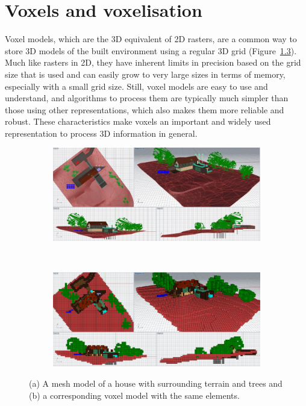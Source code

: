 
\setchapterpreamble[u]{\margintoc}

\graphicspath{{voxels/}}
\renewcommand*{\thelesson}{2.2}

\chapter{Voxels and voxelisation}%
\label{chap:voxels}

Voxel models, which are the 3D equivalent of 2D rasters, are a common way to store 3D models of the built environment using a regular 3D grid (Figure~\ref{fig:model}).
Much like rasters in 2D, they have inherent limits in precision based on the grid size that is used and can easily grow to very large sizes in terms of memory, especially with a small grid size.
Still, voxel models are easy to use and understand, and algorithms to process them are typically much simpler than those using other representations, which also makes them more reliable and robust.
These characteristics make voxels an important and widely used representation to process 3D information in general.

\begin{figure}[htbp]
\centering
\begin{subfigure}[b]{\linewidth}
\includegraphics[width=\linewidth]{figs/model-pre}
\caption{}%
\label{subfig:model-pre}
\end{subfigure}
\\
\begin{subfigure}[b]{\linewidth}
\includegraphics[width=\linewidth]{figs/model-post}
\caption{}%
\label{subfig:model-post}
\end{subfigure}
\caption{(a) A mesh model of a house with surrounding terrain and trees and (b) a corresponding voxel model with the same elements.}%
\label{fig:model}
\end{figure}

